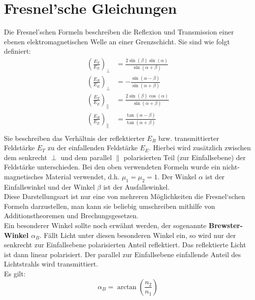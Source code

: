 \section{Fresnel'sche Gleichungen}
Die Fresnel'schen Formeln beschreiben die Reflexion und Transmission einer ebenen elektromagnetischen Welle an einer Grenzschicht.
Sie sind wie folgt definiert:
\begin{align}
    \left(\frac{E_T}{E_E}\right)_\perp&=\frac{2\sin(\beta)\sin(\alpha)}{\sin(\alpha+\beta)}\\
    \left(\frac{E_R}{E_E}\right)_\perp&=-\frac{\sin(\alpha-\beta)}{\sin(\alpha+\beta)}\\
    \left(\frac{E_T}{E_E}\right)_\parallel&=\frac{2\sin(\beta)\cos(\alpha)}{\sin(\alpha+\beta)}\\
    \left(\frac{E_R}{E_E}\right)_\parallel&=\frac{\tan(\alpha-\beta)}{\tan(\alpha+\beta)}\\    
\end{align}
Sie beschreiben das Verhältnis der reflektierter $E_R$ bzw. transmittierter Feldstärke $E_T$ zu der einfallenden Feldstärke $E_E$. \newpage
Hierbei wird zusätzlich zwischen dem senkrecht $\perp$ und dem parallel $\parallel$ polarisierten Teil (zur Einfallsebene) der Feldstärke unterschieden. 
Bei den oben verwendeten Formeln wurde ein nicht-magnetisches Material verwendet, d.h. $\mu_1=\mu_2 = 1$.
Der Winkel $\alpha$ ist der Einfallswinkel und der Winkel $\beta$ ist der Ausfallswinkel.\\
Diese Darstellungsart ist nur eine von mehreren Möglichkeiten die Fresnel`schen Formeln darzustellen, man kann sie beliebig umschreiben mithilfe 
von Additionstheoremen und Brechungsgesetzen.\\
Ein besonderer Winkel sollte noch erwähnt werden, der sogenannte \textbf{Brewster-Winkel $\alpha_B$}. Fällt Licht unter diesen besonderen Winkel 
ein, so wird nur der senkrecht zur Einfallsebene polarisierten Anteil reflektiert. Das reflektierte Licht ist dann linear polarisiert. Der parallel 
zur Einfallsebene einfallende Anteil des Lichtstrahls wird transmittiert. \citep[vgl.][]{Kohler}\\
Es gilt:
\begin{equation}
    \alpha_B = \arctan(\frac{n_2}{n_1})
\end{equation}
